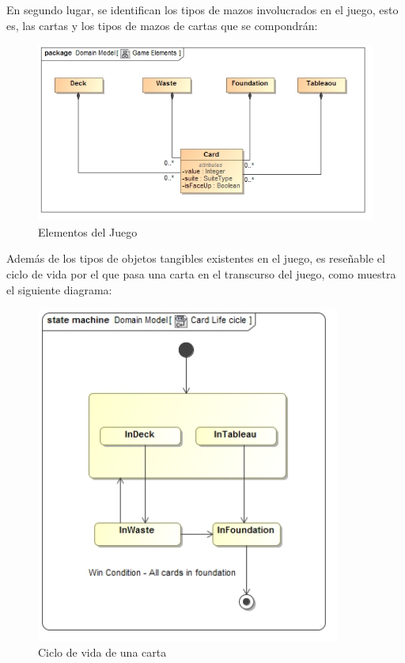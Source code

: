 \documentclass[11pt]{article}
\begin{document}
En segundo lugar, se identifican los tipos de mazos involucrados en el juego, esto es, las cartas y los tipos de mazos de cartas que se compondrán:

\begin{center}
 \begin{figure}[H]
 \begin{center}
   \includegraphics[width=15cm]{DomainModel/GameElements00.jpg}
   \caption{Elementos del Juego}
   \label{fig:gamelements}
 \end{center}
 \end{figure}
\end{center}

Además de los tipos de objetos tangibles existentes en el juego, es reseñable el ciclo de vida por el que pasa una carta en el transcurso del juego, como muestra el siguiente diagrama:

\begin{center}
 \begin{figure}[H]
 \begin{center}
   \includegraphics[width=10cm]{DomainModel/CardLifeCycle00.jpg}
   \caption{Ciclo de vida de una carta}
   \label{fig:cardlifecycle}
 \end{center}
 \end{figure}
\end{center}
\end{document}
